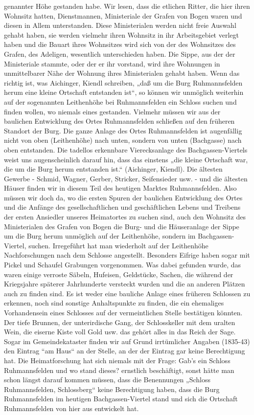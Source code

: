 \documentclass[12pt,a4paper]{book}
\begin{document}
genannter Höhe gestanden habe. Wir lesen, dass die etlichen Ritter, die hier
ihren Wohnsitz hatten, Dienstmannen, Ministeriale der Grafen von Bogen waren und
diesen in Allem unterstanden. Diese Ministerialen werden nicht freie Auswahl
gehabt haben, sie werden vielmehr ihren Wohnsitz in ihr Arbeitsgebiet verlegt
haben und die Bauart ihres Wohnsitzes wird sich von der des Wohnsitzes des
Grafen, des Adeligen, wesentlich unterschieden haben. Die Sippe, aus der der
Ministeriale stammte, oder der er ihr vorstand, wird ihre Wohnungen in
unmittelbarer Nähe der Wohnung ihres Ministerialen gehabt haben. Wenn das
richtig ist, was Aichinger, Kiendl schreiben, „daß um die Burg Ruhmannsfelden
herum eine kleine Ortschaft entstanden ist“, so können wir unmöglich weiterhin
auf der sogenannten Leithenhöhe bei Ruhmannsfelden ein Schloss suchen und finden
wollen, wo niemals eines gestanden. Vielmehr müssen wir aus der baulichen
Entwicklung des Ortes Ruhmannsfelden schließen auf den früheren Standort der
Burg. Die ganze Anlage des Ortes Ruhmannsfelden ist augenfällig nicht von oben
(Leithenhöhe) nach unten, sondern von unten (Bachgasse) nach oben entstanden.
Die tadellos erkennbare Vierecksanlage des Bachgassen-Viertels weist uns
augenscheinlich darauf hin, dass das einstens „die kleine Ortschaft war, die um
die Burg herum entstanden ist.“ (Aichinger, Kiendl). Die ältesten Gewerbe -
Schmid, Wagner, Gerber, Stricker, Seifensieder usw. - und die ältesten Häuser
finden wir in diesem Teil des heutigen Marktes Ruhmannsfelden. Also müssen wir
doch da, wo die ersten Spuren der baulichen Entwicklung des Ortes und die
Anfänge des gesellschaftlichen und geschäftlichen Lebens und Treibens der ersten
Ansiedler unseres Heimatortes zu suchen sind, auch den Wohnsitz des
Ministerialen des Grafen von Bogen die Burg- und die Häuseranlage der Sippe um
die Burg herum unmöglich auf der Leithenhöhe, sondern im Bachgassen-Viertel,
suchen. Irregeführt hat man wiederholt auf der Leithenhöhe Nachforschungen nach
dem Schlosse angestellt. Besonders Eifrige haben sogar mit Pickel und Schaufel
Grabungen vorgenommen. Was dabei gefunden wurde, das waren einige verroste
Säbeln, Hufeisen, Geldstücke, Sachen, die während der Kriegsjahre späterer
Jahrhunderte versteckt wurden und die an anderen Plätzen auch zu finden sind. Es
ist weder eine bauliche Anlage eines früheren Schlossen zu erkennen, noch sind
sonstige Anhaltspunkte zu finden, die ein ehemaliges Vorhandensein eines
Schlosses auf der vermeintlichen Stelle bestätigen könnten. Der tiefe Brunnen,
der unterirdische Gang, der Schlosskeller mit dem uralten Wein, die eiserne
Kiste voll Gold usw. das gehört alles in das Reich der Sage. Sogar im
Gemeindekataster finden wir auf Grund irrtümlicher Angaben (1835-43) den Eintrag
“am Haus“ an der Stelle, an der der Eintrag gar keine Berechtigung hat. Die
Heimatforschung hat sich niemals mit der Frage: Gab’s ein Schloss Ruhmannsfelden
und wo stand dieses? ernstlich beschäftigt, sonst hätte man schon längst darauf
kommen müssen, dass die Benennungen „Schloss Ruhmannsfelden, Schlossberg“ keine
Berechtigung haben, dass die Burg Ruhmannsfelden im heutigen Bachgassen-Viertel
stand und sich die Ortschaft Ruhmannsfelden von hier aus entwickelt hat.
\end{document}
